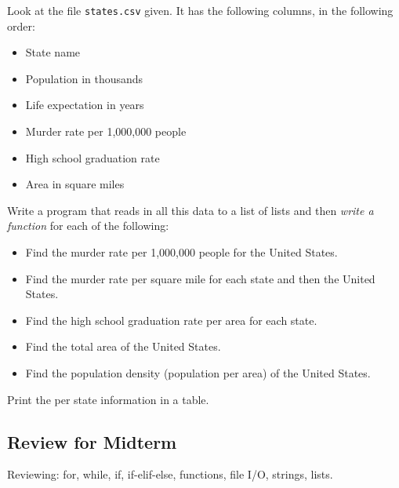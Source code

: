 \documentclass[11pt]{cselabheader}
\begin{document}
  \begin{ex}[states.py]
    Look at the file \texttt{states.csv} given. It has the following columns, in
    the following order:
    \begin{itemize}
      \item State name
      \item Population in thousands
      \item Life expectation in years
      \item Murder rate per 1,000,000 people
      \item High school graduation rate
      \item Area in square miles
    \end{itemize}

    Write a program that reads in all this data to a list of lists and then
    \emph{write a function} for each of the following:
    \begin{itemize}
      \item Find the murder rate per 1,000,000 people for the United States.
      \item Find the murder rate per square mile for each state and then the
        United States.
      \item Find the high school graduation rate per area for each state.
      \item Find the total area of the United States.
      \item Find the population density (population per area) of the United
        States.
    \end{itemize}

    Print the per state information in a table.
  \end{ex}

\subsection{Review for Midterm}
\label{subsec:reviewex}

Reviewing: for, while, if, if-elif-else, functions, file I/O, strings, lists. 
\end{document}
